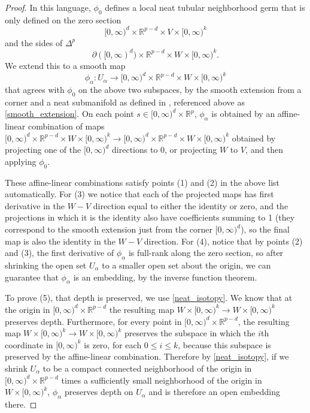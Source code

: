 \documentclass[11pt]{amsart}
\theoremstyle{definition}
\numberwithin{equation}{section}
\numberwithin{figure}{section}
\newcommand{\R}{\mathbb R}
\begin{document}
\begin{proof}
	In this language, $\phi_0$ defines a local neat tubular neighborhood germ that is only defined on the zero section
	\[ [0,\infty)^d \times \R^{p-d} \times V \times [0,\infty)^k \]
	and the sides of $\Delta^p$
	\[ \partial([0,\infty)^d) \times \R^{p-d} \times W \times [0,\infty)^k. \]
	We extend this to a smooth map
	\[ \phi_\alpha\colon U_\alpha \to [0,\infty)^d \times \R^{p-d} \times W \times [0,\infty)^k \]
	that agrees with $\phi_0$ on the above two subspaces, by the smooth extension from a corner and a neat submanifold as defined in \cite[Cor 2.32]{GIMM1}, referenced above as \autoref{smooth_extension}. On each point $s \in [0,\infty)^d \times \R^p$, $\phi_\alpha$ is obtained by an affine-linear combination of maps $[0,\infty)^d \times \R^{p-d} \times W \times [0,\infty)^k \to [0,\infty)^d \times \R^{p-d} \times W \times [0,\infty)^k$ obtained by projecting one of the $[0,\infty)^d$ directions to 0, or projecting $W$ to $V$, and then applying $\phi_0$. 
	
	These affine-linear combinations satisfy points (1) and (2) in the above list automatically. For (3) we notice that each of the projected maps has first derivative in the $W-V$ direction equal to either the identity or zero, and the projections in which it is the identity also have coefficients summing to 1 (they correspond to the smooth extension just from the corner $[0,\infty)^d$), so the final map is also the identity in the $W-V$ direction. For (4), notice that by points (2) and (3), the first derivative of $\phi_\alpha$ is full-rank along the zero section, so after shrinking the open set $U_\alpha$ to a smaller open set about the origin, we can guarantee that $\phi_\alpha$ is an embedding, by the inverse function theorem.
	
	To prove (5), that depth is preserved, we use \autoref{neat_isotopy}. We know that at the origin in $[0,\infty)^d \times \R^{p-d}$ the resulting map $W \times [0,\infty)^k \to W \times [0,\infty)^k$ preserves depth. Furthermore, for every point in $[0,\infty)^d \times \R^{p-d}$, the resulting map $W \times [0,\infty)^k \to W \times [0,\infty)^k$ preserves the subspace in which the $i$th coordinate in $[0,\infty)^k$ is zero, for each $0 \leq i \leq k$, because this subspace is preserved by the affine-linear combination. Therefore by \autoref{neat_isotopy}, if we shrink $U_\alpha$ to be a compact connected neighborhood of the origin in $[0,\infty)^d \times \R^{p-d}$ times a sufficiently small neighborhood of the origin in $W \times [0,\infty)^k$, $\phi_\alpha$ preserves depth on $U_\alpha$ and is therefore an open embedding there.
	

\end{proof}
\end{document}
